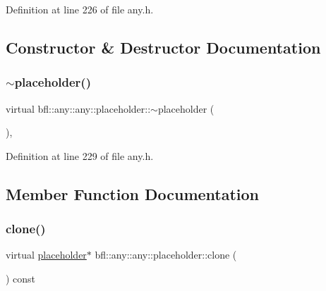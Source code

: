 Definition at line 226 of file any.\+h.



\subsection{Constructor \& Destructor Documentation}
\mbox{\label{classbfl_1_1any_1_1any_1_1placeholder_a1ca3b3d60d9c7d6749759165b28a8111}} 
\subsubsection{\texorpdfstring{$\sim$placeholder()}{~placeholder()}}
{\footnotesize\ttfamily virtual bfl\+::any\+::any\+::placeholder\+::$\sim$placeholder (\begin{DoxyParamCaption}{ }\end{DoxyParamCaption})\hspace{0.3cm}{\ttfamily [inline]}, {\ttfamily [virtual]}}



Definition at line 229 of file any.\+h.



\subsection{Member Function Documentation}
\mbox{\label{classbfl_1_1any_1_1any_1_1placeholder_a6dba5b12e7e4a4247f03cfdb762a3f58}} 
\subsubsection{\texorpdfstring{clone()}{clone()}}
{\footnotesize\ttfamily virtual \mbox{\hyperlink{classbfl_1_1any_1_1any_1_1placeholder}{placeholder}}$\ast$ bfl\+::any\+::any\+::placeholder\+::clone (\begin{DoxyParamCaption}{ }\end{DoxyParamCaption}) const\hspace{0.3cm}{\ttfamily [pure virtual]}}



